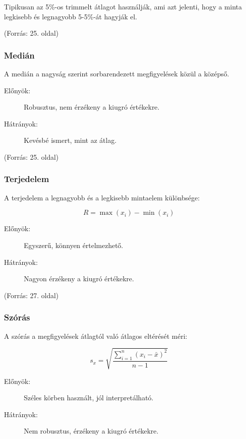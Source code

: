 \documentclass[a4paper,12pt]{article}
\begin{document}
Tipikusan az 5\%-os trimmelt átlagot használják, ami azt jelenti, hogy a minta legkisebb és legnagyobb 5-5\%-át hagyják el.

(Forrás: 25. oldal)

\subsubsection{Medián}

A medián a nagyság szerint sorbarendezett megfigyelések közül a középső.

\begin{description}
\item[Előnyök:] Robusztus, nem érzékeny a kiugró értékekre.
\item[Hátrányok:] Kevésbé ismert, mint az átlag.
\end{description}

(Forrás: 25. oldal)

\subsubsection{Terjedelem}

A terjedelem a legnagyobb és a legkisebb mintaelem különbsége:

\begin{equation}
R = \max(x_i) - \min(x_i)
\end{equation}

\begin{description}
\item[Előnyök:] Egyszerű, könnyen értelmezhető.
\item[Hátrányok:] Nagyon érzékeny a kiugró értékekre.
\end{description}

(Forrás: 27. oldal)

\subsubsection{Szórás}

A szórás a megfigyelések átlagtól való átlagos eltérését méri:

\begin{equation}
s_x = \sqrt{\frac{\sum_{i=1}^n (x_i - \bar{x})^2}{n-1}}
\end{equation}

\begin{description}
\item[Előnyök:] Széles körben használt, jól interpretálható.
\item[Hátrányok:] Nem robusztus, érzékeny a kiugró értékekre.
\end{description}
\end{document}
